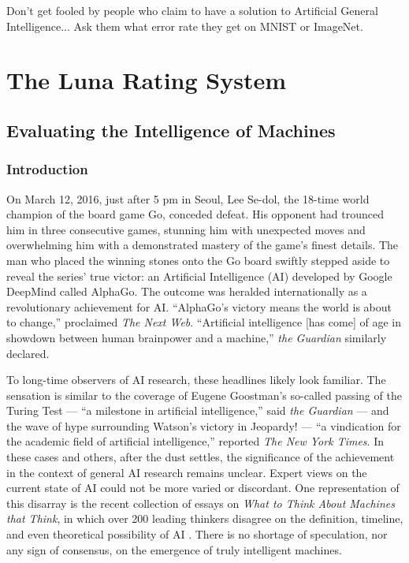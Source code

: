 \begin{savequote}[75mm]
Don't get fooled by people who claim to have a solution to Artificial General Intelligence... Ask them what error rate they get on MNIST or ImageNet.
\end{savequote}


\chapter{The Luna Rating System}

\section{Evaluating the Intelligence of Machines}

\subsection{Introduction}

On March 12, 2016, just after 5 pm in Seoul, Lee Se-dol, the 18-time world champion of the board game Go, conceded defeat. His opponent had trounced him in three consecutive games, stunning him with unexpected moves and overwhelming him with a demonstrated mastery of the game's finest details. The man who placed the winning stones onto the Go board swiftly stepped aside to reveal the series' true victor: an Artificial Intelligence (AI) developed by Google DeepMind called AlphaGo. The outcome was heralded internationally as a revolutionary achievement for AI. ``AlphaGo's victory means the world is about to change,'' proclaimed \textit{The Next Web}\cite{1_nextweb_2016}. ``Artificial intelligence [has come] of age in showdown between human brainpower and a machine,'' \textit{the Guardian} similarly declared\cite{1_the_guardian_2016}. 

To long-time observers of AI research, these headlines likely look familiar. The sensation is similar to the coverage of Eugene Goostman's so-called passing of the Turing Test --- ``a milestone in artificial intelligence,'' said \textit{the Guardian}\cite{1_the_guardian_2014, occasional_pamphlet_2014} --- and the wave of hype surrounding Watson's victory in Jeopardy! --- ``a vindication for the academic field of artificial intelligence,'' reported \textit{The New York Times}\cite{1_newyorktimes_2011}. In these cases and others, after the dust settles, the significance of the achievement in the context of general AI research remains unclear. Expert views on the current state of AI could not be more varied or discordant. One representation of this disarray is the recent collection of essays on \textit{What to Think About Machines that Think}, in which over 200 leading thinkers disagree on the definition, timeline, and even theoretical possibility of AI \cite{edge2016what}. There is no shortage of speculation, nor any sign of consensus, on the emergence of truly intelligent machines.

